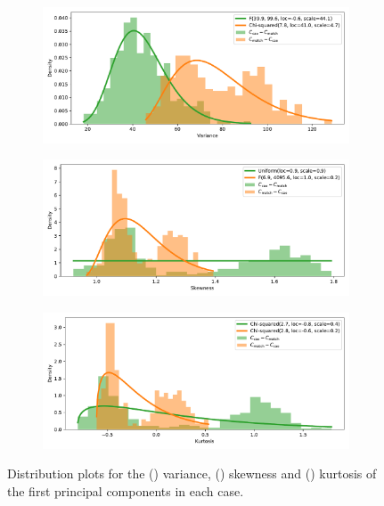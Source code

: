 \begin{figure}
    \centering
    \begin{subfigure}{\imgwidth}
        \includegraphics[width=\linewidth]{variance.pdf}%
        \caption{}\label{fig:edo_variance}
    \end{subfigure}

    \begin{subfigure}{\imgwidth}
        \includegraphics[width=\linewidth]{skewness.pdf}%
    \caption{}\label{fig:edo_skewness}
    \end{subfigure}
    
    \begin{subfigure}{\imgwidth}
        \includegraphics[width=\linewidth]{kurtosis.pdf}%
        \caption{}\label{fig:edo_kurtosis}
    \end{subfigure}
    \caption{Distribution plots for the () variance,
        () skewness and ()
        kurtosis of the first principal components in each
        case.}\label{fig:edo_moments}
\end{figure}

